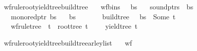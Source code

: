 \begin{isabellebody}
\isadelimproof
%
\endisadelimproof
%
\isatagproof
%
\endisatagproof
{\isafoldproof}%
%
\isadelimproof
%
\endisadelimproof
%
\begin{isamarkuptext}%
%
\end{isamarkuptext}\isamarkuptrue%
\isamarkupfalse%
\ wf{\isacharunderscore}{\kern0pt}rule{\isacharunderscore}{\kern0pt}root{\isacharunderscore}{\kern0pt}yield{\isacharunderscore}{\kern0pt}tree{\isacharunderscore}{\kern0pt}build{\isacharunderscore}{\kern0pt}tree{\isacharcolon}{\kern0pt}\isanewline
\ \ \ {\isachardoublequoteopen}wf{\isacharunderscore}{\kern0pt}bins\ {\isasymG}\ {\isasymomega}\ bs{\isachardoublequoteclose}\isanewline
\ \ \ {\isachardoublequoteopen}sound{\isacharunderscore}{\kern0pt}ptrs\ {\isasymomega}\ bs{\isachardoublequoteclose}\isanewline
\ \ \ {\isachardoublequoteopen}mono{\isacharunderscore}{\kern0pt}red{\isacharunderscore}{\kern0pt}ptr\ bs{\isachardoublequoteclose}\isanewline
\ \ \ {\isachardoublequoteopen}{\isacharbar}{\kern0pt}bs{\isacharbar}{\kern0pt}\ {\isacharequal}{\kern0pt}\ {\isacharbar}{\kern0pt}{\isasymomega}{\isacharbar}{\kern0pt}\ {\isacharplus}{\kern0pt}\ {}{\isachardoublequoteclose}\isanewline
\ \ \ {\isachardoublequoteopen}build{\isacharunderscore}{\kern0pt}tree\ {\isasymG}\ {\isasymomega}\ bs\ {\isacharequal}{\kern0pt}\ Some\ t{\isachardoublequoteclose}\isanewline
\ \ \ {\isachardoublequoteopen}wf{\isacharunderscore}{\kern0pt}rule{\isacharunderscore}{\kern0pt}tree\ {\isasymG}\ t\ {\isasymand}\ root{\isacharunderscore}{\kern0pt}tree\ t\ {\isacharequal}{\kern0pt}\ {\isasymSS}\ {\isasymG}\ {\isasymand}\ yield{\isacharunderscore}{\kern0pt}tree\ t\ {\isacharequal}{\kern0pt}\ {\isasymomega}{\isachardoublequoteclose}%
\isadelimproof
%
\endisadelimproof
%
\isatagproof
%
\endisatagproof
{\isafoldproof}%
%
\isadelimproof
%
\endisadelimproof
%
\begin{isamarkuptext}%
%
\end{isamarkuptext}\isamarkuptrue%
\isamarkupfalse%
\ wf{\isacharunderscore}{\kern0pt}rule{\isacharunderscore}{\kern0pt}root{\isacharunderscore}{\kern0pt}yield{\isacharunderscore}{\kern0pt}tree{\isacharunderscore}{\kern0pt}build{\isacharunderscore}{\kern0pt}tree{\isacharunderscore}{\kern0pt}{\isasymE}arley{\isacharunderscore}{\kern0pt}list{\isacharcolon}{\kern0pt}\isanewline
\ \ \ {\isachardoublequoteopen}wf{\isacharunderscore}{\kern0pt}{\isasymG}\ {\isasymG}{\isachardoublequoteclose}\isanewline

\end{isabellebody}
